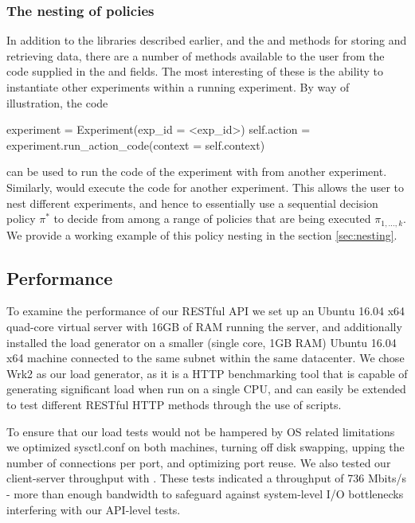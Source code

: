 \documentclass[nojss]{jss}
\begin{document}
\subsubsection{The nesting of policies}

In addition to the libraries described earlier, and the  and  methods for storing and retrieving data, there are a number of methods available to the user from the code supplied in the   and  fields. The most interesting of these is the ability to instantiate other experiments within a running experiment. By way of illustration, the code
\begin{Code}
experiment = Experiment(exp_id =  <exp_id>)
self.action = experiment.run_action_code(context =  self.context)
\end{Code}
can be used to run the  code of the experiment with  from another experiment. Similarly,  would execute the  code for another experiment. This allows the user to nest different experiments, and hence to essentially use a sequential decision policy $\pi^*$ to decide from among a range of policies that are being executed $\pi_{1, \dots, k}$. We provide a working example of this policy nesting in the section
\ref{sec:nesting}.


\subsection{Performance}

To examine the performance of our RESTful API we set up an Ubuntu 16.04 x64 quad-core virtual server with 16GB of RAM running the  server, and additionally installed the  load generator on a smaller (single core, 1GB RAM) Ubuntu 16.04 x64 machine connected to the same subnet within the same datacenter. We chose Wrk2 \citep{tenetene} as our load generator, as it is a HTTP benchmarking tool that is capable of generating significant load when run on a single CPU, and can easily be extended to test different RESTful HTTP methods through the use of  scripts.

To ensure that our load tests would not be hampered by OS related limitations we optimized sysctl.conf on both machines, turning off disk swapping, upping the number of connections per port, and optimizing port reuse. We also tested our client-server throughput with  \citep{Iperf.fr2016}. These tests indicated a throughput of 736 Mbits/s - more than enough bandwidth to safeguard against system-level I/O bottlenecks interfering with our API-level tests.
\end{document}
